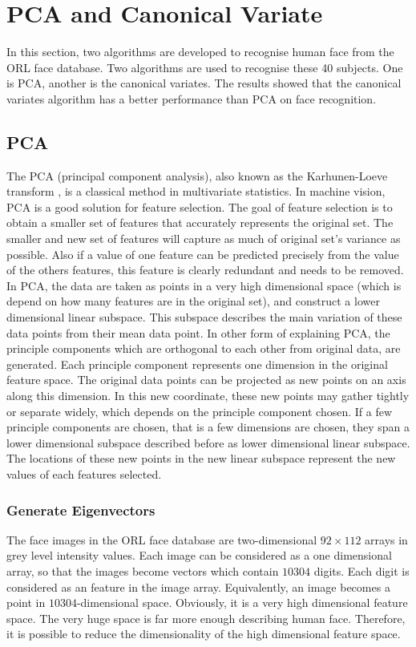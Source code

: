 \chapter{PCA and Canonical Variate}
\label{apx:pcaca}
In this section, two algorithms are developed to recognise human face from the ORL face database. Two algorithms are used to recognise these 40 subjects. One is PCA, another is the canonical variates. The results showed that the canonical variates algorithm has a better performance than PCA on face recognition. 
\section{PCA}
The PCA (principal component analysis), also known as the Karhunen-Loeve transform \cite{Loeve1955}, is a classical method in multivariate statistics. In machine vision, PCA is a good solution for feature selection. The goal of feature selection is to obtain a smaller set of features that accurately represents the original set. The smaller and new set of features will capture as much of original set's variance as possible. Also if a value of one feature can be predicted precisely from the value of the others features, this feature is clearly redundant and needs to be removed. In PCA, the data are taken as points in a very high dimensional space (which is depend on how many features are in the original set), and construct a lower dimensional linear subspace. This subspace describes the main variation of these data points from their mean data point. In other form of explaining PCA, the principle components which are orthogonal to each other from original data, are generated. Each principle component represents one dimension in the original feature space. The original data points can be projected as new points on an axis along this dimension. In this new coordinate, these new points may gather tightly or separate widely, which depends on the principle component chosen. If a few principle components are chosen, that is a few dimensions are chosen, they span a lower dimensional subspace described before as lower dimensional linear subspace. The locations of these new points in the new linear subspace represent the new values of each features selected.

\subsection{Generate Eigenvectors}
The face images in the \mbox{ORL} face database are two-dimensional $92\times 112$ arrays in grey level intensity values. Each image can be considered as a one dimensional array, so that the images become vectors which contain $10304$ digits. Each digit is considered as an feature in the image array. Equivalently, an image becomes a point in $10304$-dimensional space. Obviously, it is a very high dimensional feature space. The very huge space is far more enough describing human face. Therefore, it is possible to reduce the dimensionality of the high dimensional feature space.

